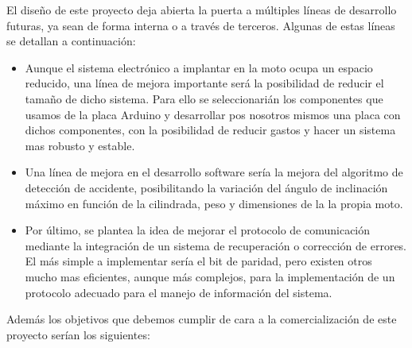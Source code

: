 		El dise\~no de este proyecto deja abierta la puerta a múltiples líneas de desarrollo futuras, ya sean de forma interna o a través de terceros. Algunas de estas líneas se detallan a continuación:
		
		\begin{itemize}	
			\item Aunque el sistema electrónico a implantar en la moto ocupa un espacio reducido, una línea de mejora importante será la posibilidad de reducir el tama\~no de dicho sistema. Para ello se seleccionarián los componentes que usamos de la placa Arduino y desarrollar pos nosotros mismos una placa con dichos componentes, con la posibilidad de reducir gastos y hacer un sistema mas robusto y estable. 
			
			\item Una línea de mejora en el desarrollo software sería la mejora del algoritmo de detección de accidente, posibilitando la variación del ángulo de inclinación máximo en función de la cilindrada, peso y dimensiones de la la propia moto.
			
			\item Por último, se plantea la idea de mejorar el protocolo de comunicación mediante la integración de un sistema de recuperación o corrección de errores. El más simple a implementar sería el bit de paridad, pero existen otros mucho mas eficientes, aunque más complejos, para la implementación de un protocolo adecuado para el manejo de información del sistema.
			
		\end{itemize}
		
		Además los objetivos que debemos cumplir de cara a la comercialización de este proyecto serían los siguientes:
		
